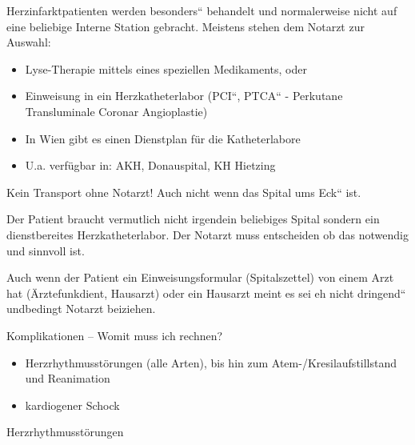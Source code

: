 \documentclass{article}
\begin{document}
Herzinfarktpatienten werden {\quotedblbase}besonders{\textquotedblleft}
behandelt und normalerweise nicht auf eine beliebige Interne Station
gebracht. Meistens stehen dem Notarzt zur Auswahl:

\begin{itemize}
\item Lyse-Therapie mittels eines speziellen Medikaments, oder

\item Einweisung in ein Herzkatheterlabor
({\quotedblbase}PCI{\textquotedblleft},
{\quotedblbase}PTCA{\textquotedblleft} {}- Perkutane
Transluminale Coronar Angioplastie)

\end{itemize}
\begin{itemize}
\item In Wien gibt es einen Dienstplan f\"ur die Katheterlabore

\end{itemize}
\begin{itemize}
\item U.a. verf\"ugbar in: AKH, Donauspital, KH Hietzing

\end{itemize}
Kein Transport ohne Notarzt! Auch nicht wenn das Spital
{\quotedblbase}um{\textquotesingle}s Eck{\textquotedblleft} ist.

Der Patient braucht vermutlich nicht irgendein beliebiges Spital sondern
ein dienst\-bereites Herzkatheterlabor. Der Notarzt muss entscheiden ob
das notwendig und sinnvoll ist. 

Auch wenn der Patient ein Einweisungsformular (Spitalszettel) von einem
Arzt hat (\"Arztefunkdient, Hausarzt) oder ein Hausarzt meint
{\quotedblbase}es sei eh nicht dringend{\textquotedblleft} undbedingt
Notarzt beiziehen.

Komplikationen -- Womit muss ich rechnen?

\begin{itemize}
\item Herzrhythmusst\"orungen (alle Arten), bis hin zum
Atem-/Kresilaufstillstand und Reanimation

\item kardiogener Schock

\end{itemize}
Herzrhythmusst\"orungen 
\end{document}
